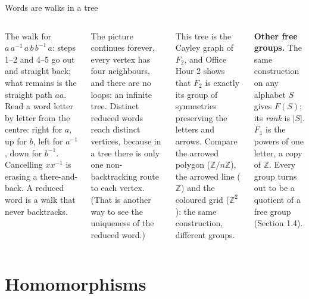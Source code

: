 \documentclass[aspectratio=169,10pt]{beamer}
\newcommand{\Z}{\mathbb{Z}}
\newcommand{\inv}{^{-1}}
\begin{document}
\begin{frame}{Words are walks in a tree}
\begin{columns}[T]
\centering\scalebox{0.58}{\figtree}\par\vspace{2pt}
\centering\scalebox{0.46}{\figwordpath}\par
{\scriptsize The walk for $a\,a\inv\,a\,b\,b\inv\,a$: steps 1--2 and 4--5 go out and straight back; what remains is the straight path $aa$.}
\small
Read a word letter by letter from the centre: right for $a$, up for $b$, left for $a\inv$, down for $b\inv$. Cancelling $xx\inv$ is erasing a there-and-back. A reduced word is a walk that never backtracks.
\vspace{4pt}

The picture continues forever, every vertex has four neighbours, and there are no loops: an infinite tree. Distinct reduced words reach distinct vertices, because in a tree there is only one non-backtracking route to each vertex. (That is another way to see the uniqueness of the reduced word.)
\begin{bigbox}
This tree is the Cayley graph of $F_2$, and Office Hour 2 shows that $F_2$ is exactly its group of symmetries preserving the letters and arrows. Compare the arrowed polygon ($\Z/n\Z$), the arrowed line ($\Z$) and the coloured grid ($\Z^2$): the same construction, different groups.
\end{bigbox}
\textbf{Other free groups.} The same construction on any alphabet $S$ gives $F(S)$; its \emph{rank} is $|S|$. $F_1$ is the powers of one letter, a copy of $\Z$. Every group turns out to be a quotient of a free group (Section 1.4).
\end{columns}
\end{frame}

\section{Homomorphisms}
\end{document}
